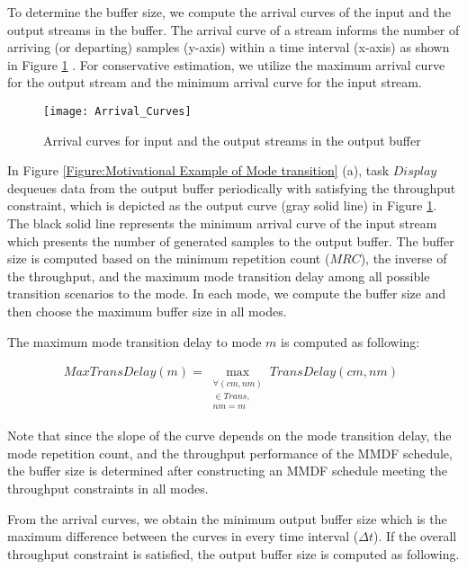 \documentclass[prodmode,acmtecs]{acmsmall}
\begin{document}
To determine the buffer size, we compute the arrival curves of the input and the output streams in the buffer. The arrival curve of a stream informs the number of arriving (or departing) samples (y-axis) within a time interval (x-axis) as shown in Figure \ref{Figure:Arribal Curves} \cite{Thiele:2000}. For conservative estimation, we utilize the maximum arrival curve for the output stream and the minimum arrival curve for the input stream.

\begin{figure} [ht]
\centerline{\texttt{[image: Arrival\_Curves]}}
\caption{Arrival curves for input and the output streams in the output buffer}
\label{Figure:Arribal Curves}
\end{figure}

In Figure \ref{Figure:Motivational Example of Mode transition} (a), task $Display$ dequeues data from the output buffer periodically with satisfying the throughput constraint, which is depicted as the output curve (gray solid line) in Figure \ref{Figure:Arribal Curves}. The black solid line represents the minimum arrival curve of the input stream which presents the number of generated samples to the output buffer. The buffer size is computed based on the minimum repetition count ($MRC$), the inverse of the throughput, and the maximum mode transition delay among all possible transition scenarios to the mode. In each mode, we compute the buffer size and then choose the maximum buffer size in all modes.

The maximum mode transition delay to mode $m$ is computed as following: 

\begin{definition}
\label{Definition:Worst Case Mode Transition Delay}
\begin{gather*}
MaxTransDelay(m) = \max_{\substack{\forall (cm, nm) \\ \in Trans, \\ nm = m}} TransDelay(cm,n m) \:\: 
\end{gather*}
\end{definition}

Note that since the slope of the curve depends on the mode transition delay, the mode repetition count, and the throughput performance of the MMDF schedule, the buffer size is determined after constructing an MMDF schedule meeting the throughput constraints in all modes. 

From the arrival curves, we obtain the minimum output buffer size which is the maximum difference between the curves in every time interval ($\Delta t$). If the overall throughput constraint is satisfied, the output buffer size is computed as following.
\end{document}
